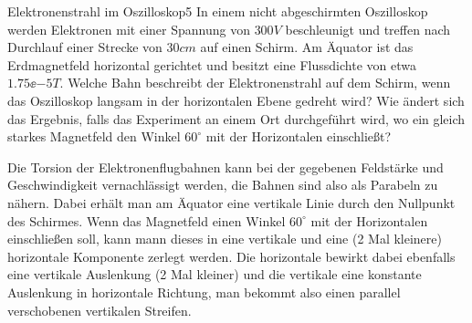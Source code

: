 \begin{problem}{Elektronenstrahl im Oszilloskop}{5}
In einem nicht abgeschirmten Oszilloskop werden Elektronen mit einer Spannung von $300 \unit{V}$ beschleunigt und treffen nach Durchlauf einer Strecke von $30 \unit{cm}$ auf einen Schirm. Am Äquator ist das Erdmagnetfeld horizontal gerichtet und besitzt eine Flussdichte von etwa $1.75\ee{-5} \unit{T}$. Welche Bahn beschreibt der Elektronenstrahl auf dem Schirm, wenn das Oszilloskop langsam in der horizontalen Ebene gedreht wird? Wie ändert sich das Ergebnis, falls das Experiment an einem Ort durchgeführt wird, wo ein gleich starkes Magnetfeld den Winkel $60^\circ$ mit der Horizontalen einschließt?
\begin{solution}
Die Torsion der Elektronenflugbahnen kann bei der gegebenen Feldstärke und Geschwindigkeit vernachlässigt werden, die Bahnen sind also als Parabeln zu nähern. Dabei erhält man am Äquator eine vertikale Linie durch den Nullpunkt des Schirmes. Wenn das Magnetfeld einen Winkel $60^\circ$ mit der Horizontalen einschließen soll, kann mann dieses in eine vertikale und eine (2 Mal kleinere) horizontale Komponente zerlegt werden. Die horizontale bewirkt dabei ebenfalls eine vertikale Auslenkung (2 Mal kleiner) und die vertikale eine konstante Auslenkung in horizontale Richtung, man bekommt also einen parallel verschobenen vertikalen Streifen.
\end{solution}
\end{problem}

